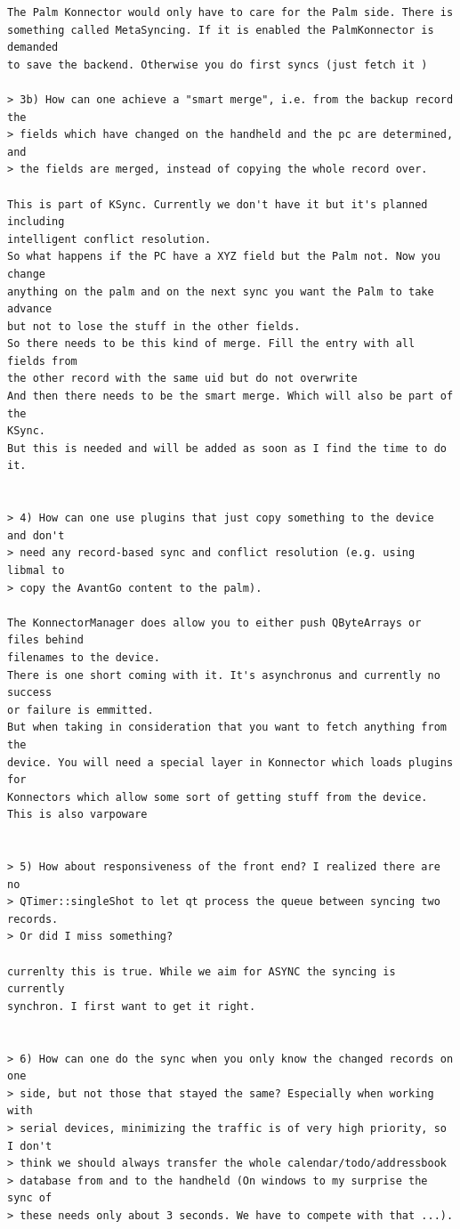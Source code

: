 \documentclass[10pt,a4paper]{article}
\begin{document}
{\begin{verbatim}
The Palm Konnector would only have to care for the Palm side. There is 
something called MetaSyncing. If it is enabled the PalmKonnector is demanded 
to save the backend. Otherwise you do first syncs (just fetch it )

> 3b) How can one achieve a "smart merge", i.e. from the backup record the
> fields which have changed on the handheld and the pc are determined, and
> the fields are merged, instead of copying the whole record over.

This is part of KSync. Currently we don't have it but it's planned including 
intelligent conflict resolution.
So what happens if the PC have a XYZ field but the Palm not. Now you change 
anything on the palm and on the next sync you want the Palm to take advance 
but not to lose the stuff in the other fields.
So there needs to be this kind of merge. Fill the entry with all fields from 
the other record with the same uid but do not overwrite
And then there needs to be the smart merge. Which will also be part of the 
KSync.
But this is needed and will be added as soon as I find the time to do it. 


> 4) How can one use plugins that just copy something to the device and don't
> need any record-based sync and conflict resolution (e.g. using libmal to
> copy the AvantGo content to the palm).

The KonnectorManager does allow you to either push QByteArrays or files behind 
filenames to the device. 
There is one short coming with it. It's asynchronus and currently no success 
or failure is emmitted.
But when taking in consideration that you want to fetch anything from the 
device. You will need a special layer in Konnector which loads plugins for 
Konnectors which allow some sort of getting stuff from the device.
This is also varpoware


> 5) How about responsiveness of the front end? I realized there are no
> QTimer::singleShot to let qt process the queue between syncing two records.
> Or did I miss something?

currenlty this is true. While we aim for ASYNC the syncing is currently 
synchron. I first want to get it right.


> 6) How can one do the sync when you only know the changed records on one
> side, but not those that stayed the same? Especially when working with
> serial devices, minimizing the traffic is of very high priority, so I don't
> think we should always transfer the whole calendar/todo/addressbook
> database from and to the handheld (On windows to my surprise the sync of
> these needs only about 3 seconds. We have to compete with that ...).


\end{verbatim}}
\end{document}
